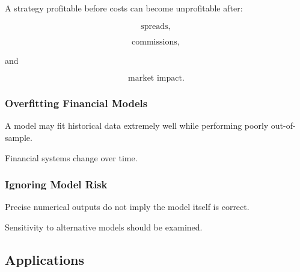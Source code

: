 A strategy profitable before costs can become unprofitable after:

\[
\boxed{
\text{spreads},
}
\]

\[
\boxed{
\text{commissions},
}
\]

and

\[
\boxed{
\text{market impact}.
}
\]

\subsubsection{Overfitting Financial Models}

A model may fit historical data extremely well while performing poorly
out-of-sample.

Financial systems change over time.

\subsubsection{Ignoring Model Risk}

Precise numerical outputs do not imply the model itself is correct.

Sensitivity to alternative models should be examined.

\subsection{Applications}
\label{subsec:mathematical-finance-applications}


